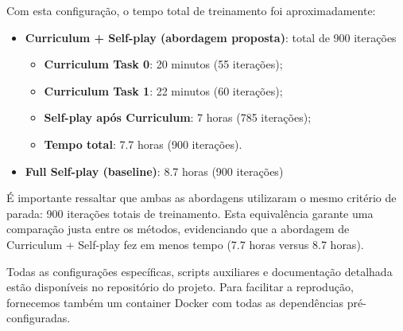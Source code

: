Com esta configuração, o tempo total de treinamento foi aproximadamente:

\begin{itemize}
    \item \textbf{Curriculum + Self-play (abordagem proposta)}: total de 900 iterações
    \begin{itemize}
        \item \textbf{Curriculum Task 0}: 20 minutos (55 iterações);
        \item \textbf{Curriculum Task 1}: 22 minutos (60 iterações);
        \item \textbf{Self-play após Curriculum}: 7 horas (785 iterações);
        \item \textbf{Tempo total}: 7.7 horas (900 iterações).
    \end{itemize}
    \item \textbf{Full Self-play (baseline)}: 8.7 horas (900 iterações)
\end{itemize}

É importante ressaltar que ambas as abordagens utilizaram o mesmo critério de parada: 900 iterações totais de treinamento. Esta equivalência garante uma comparação justa entre os métodos, evidenciando que a abordagem de Curriculum + Self-play fez em menos tempo (7.7 horas versus 8.7 horas).

Todas as configurações específicas, scripts auxiliares e documentação detalhada estão disponíveis no repositório do projeto. Para facilitar a reprodução, fornecemos também um container Docker com todas as dependências pré-configuradas.
